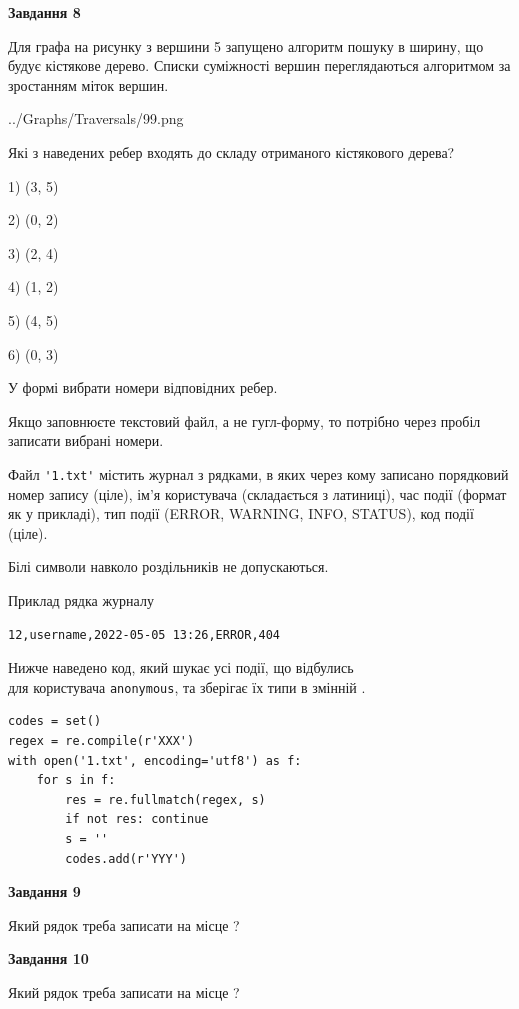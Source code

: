 \documentclass[12pt, ukrainian]{article}
\def\code#1{\Verb!#1!}
\begin{document}
{\begin {large}
{\begin {center}\textbf{Завдання 8}\end {center}}\par
Для графа на рисунку з вершини 5 запущено алгоритм пошуку в ширину, що будує кістякове дерево. Списки суміжності вершин переглядаються алгоритмом за зростанням міток вершин.\par
\begin{center}
	{../Graphs/Traversals/99.png}
\end{center}
\par Які з наведених ребер входять до складу отриманого кістякового дерева?\par
1) (3, 5)\par
2) (0, 2)\par
3) (2, 4)\par
4) (1, 2)\par
5) (4, 5)\par
6) (0, 3)\par
{\vskip 15pt} У формі вибрати номери відповідних ребер.


Якщо заповнюєте текстовий файл, а не гугл-форму, то потрібно через пробіл записа\-ти вибрані номери.\par
\newpage


Файл \code{'1.txt'} містить журнал з рядками, в яких через кому записано поряд\-ко\-вий номер запису (ціле), ім'я користувача (складається з латиниці), час події (фор\-мат як у прикладі), тип події (ERROR, WARNING, INFO, STATUS), код події (ціле).

Білі символи навколо роздільників не допускаються.

Приклад рядка журналу



\begin{verbatim}
12,username,2022-05-05 13:26,ERROR,404
\end{verbatim}


Нижче наведено код, який шукає усі події, що відбулись\\ для користувача \code{anonymous}, та зберігає їх типи в змінній .



\begin{verbatim}
codes = set()
regex = re.compile(r'XXX')
with open('1.txt', encoding='utf8') as f:
    for s in f:
        res = re.fullmatch(regex, s)
        if not res: continue
        s = ''
        codes.add(r'YYY')
\end{verbatim}


{\begin {center}\textbf{Завдання 9}\end {center}}\par
Який рядок треба записати на місце  ?\par
\vspace{5mm}


{\begin {center}\textbf{Завдання 10}\end {center}}\par
Який рядок треба записати на місце  ?\par


\newpage


\end {large}}
\end{document}
